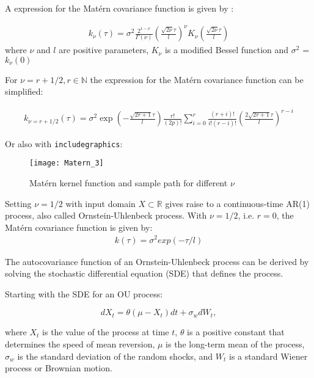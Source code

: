 A expression for the Matérn covariance function is given by \citeauthor{rasmussen_gaussian_2006}:

\begin{gather*}
    k_{\nu}(\tau) = \sigma^2 \frac{2^{1-\nu}}{\Gamma(\nu)}(\frac{\sqrt{2\nu} \tau}{l})^{\nu} K_{\nu}
    (\frac{\sqrt{2\nu} \tau}{l})
\end{gather*}
where $\nu$ and $l$ are positive parameters, $K_{\nu}$ is a modified Bessel function and
$\sigma^2$ = $k_{\nu}(0)$

For $\nu = r + 1/2, r \in \mathbb{N}$ the expression for the Matérn covariance function can be simplified:

\begin{gather}\label{kernel-matern}
    k_{\nu=r+1/2}(\tau) = \sigma^2 \exp(-\frac{\sqrt{2r + 1} \tau}{l}) \frac{r!}{(2p)!}
    \sum_{i=0}^{r} \frac{(r+i)!}{i!(r-i)!}(\frac{2 \sqrt{2 r + 1} \tau}{l})^{r-i}
\end{gather}


Or also with \texttt{includegraphics}:
\begin{figure}[hbt!]%
  \centering
  \texttt{[image: Matern\_3]} %
  \caption[Geyser data: binned histogram, Silverman's and another
  kernel]%
  {Matérn kernel function and sample path for different $\nu$}%
  \label{fig:matern}
\end{figure}


Setting $\nu = 1/2$ with input domain $X \subset \mathbb{R}$ gives raise to a continuous-time AR(1) process,
also called Ornstein-Uhlenbeck process.
With $\nu = 1/2$, i.e. $r=0$, the Matérn covariance function is given by:
\begin{gather}\label{kernel-matern-ar1}
    k(\tau) = \sigma^2 exp(- \tau/l)
\end{gather}

The autocovariance function of an Ornstein-Uhlenbeck process can be derived by solving the stochastic differential equation (SDE) that defines the process.

Starting with the SDE for an OU process:

$$dX_t = \theta (\mu - X_t)dt + \sigma_w dW_t,$$

where $X_t$ is the value of the process at time $t$, $\theta$ is a positive constant that determines the speed of mean reversion,
$\mu$ is the long-term mean of the process, $\sigma_w$ is the standard deviation of the random shocks, and $W_t$ is a standard Wiener process or Brownian motion.

